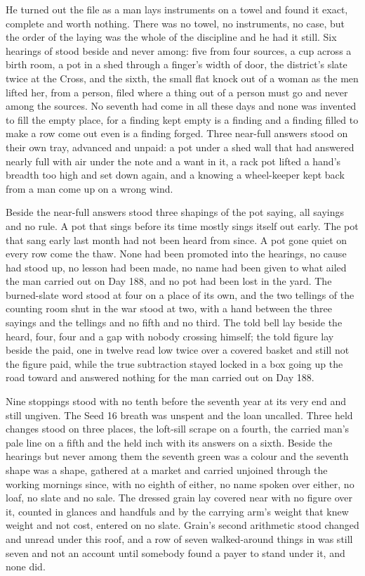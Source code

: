 He turned out the file as a man lays instruments on a towel and found it exact, complete and worth nothing. There was no towel, no instruments, no case, but the order of the laying was the whole of the discipline and he had it still. Six hearings of  stood beside and never among: five from four sources, a cup across a birth room, a pot in a shed through a finger's width of door, the district's slate twice at the Cross, and the sixth, the small flat knock out of a woman as the men lifted her, from a person, filed where a thing out of a person must go and never among the sources. No seventh had come in all these days and none was invented to fill the empty place, for a finding kept empty is a finding and a finding filled to make a row come out even is a finding forged. Three near-full answers stood on their own tray, advanced and unpaid: a pot under a shed wall that had answered nearly full with air under the note and a want in it, a rack pot lifted a hand's breadth too high and set down again, and a knowing a wheel-keeper kept back from a man come up on a wrong wind.

Beside the near-full answers stood three shapings of the pot saying, all sayings and no rule. A pot that sings before its time mostly sings itself out early. The pot that sang early last month had not been heard from since. A pot gone quiet on every row come the thaw. None had been promoted into the hearings, no cause had stood up, no lesson had been made, no name had been given to what ailed the man carried out on Day 188, and no pot had been lost in the yard. The burned-slate word stood at four on a place of its own, and the two tellings of the counting room shut in the war stood at two, with a hand between the three sayings and the tellings and no fifth and no third. The told bell lay beside the heard, four, four and a gap with nobody crossing himself; the told figure lay beside the paid, one in twelve read low twice over a covered basket and still not the figure paid, while the true subtraction stayed locked in a box going up the road toward  and answered nothing for the man carried out on Day 188.

Nine stoppings stood with no tenth before the seventh year at its very end and still ungiven. The Seed 16 breath was unspent and the loan uncalled. Three held changes stood on three places, the loft-sill scrape on a fourth, the carried man's pale line on a fifth and the held inch with its answers on a sixth. Beside the hearings but never among them the seventh green was a colour and the seventh shape was a shape, gathered at a market and carried unjoined through the working mornings since, with no eighth of either, no name spoken over either, no loaf, no slate and no sale. The dressed grain lay covered near  with no figure over it, counted in glances and handfuls and by the carrying arm's weight that knew weight and not cost, entered on no slate. Grain's second arithmetic stood changed and unread under this roof, and a row of seven walked-around things in  was still seven and not an account until somebody found a payer to stand under it, and none did.

